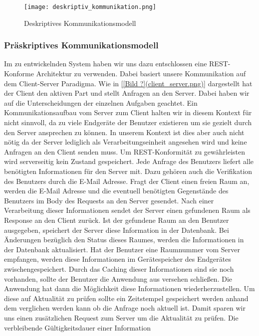 \begin{figure}[h]
	\centering
	\texttt{[image: deskriptiv\_kommunikation.png]}
	\caption{ Deskriptives Kommunikationsmodell}
\end{figure}

\subsubsection{Präskriptives Kommunikationsmodell}
\label{sec:Präskriptives_Kommunikationsmodell}

Im zu entwickelnden System haben wir uns dazu entschlossen eine REST-Konforme
Architektur zu verwenden.
Dabei basiert unsere Kommunikation auf dem Client-Server Paradigma. Wie in 
\ref{[Bild ?](client_server.png)} dargestellt hat der Client den aktiven 
Part und stellt Anfragen an den Server.
Dabei haben wir auf die Unterscheidungen der einzelnen Aufgaben geachtet.
Ein Kommunikationsaufbau vom Server zum Client halten wir in diesem Kontext für
nicht sinnvoll, da zu viele Endgeräte der Benutzer existieren um sie gezielt
durch den Server ansprechen zu können. In unserem Kontext ist dies aber auch
nicht nötig da der Server lediglich als Verarbeitungseinheit angesehen wird und
keine Anfragen an den Client senden muss.
Um REST-Konformität zu gewährleisten wird serverseitig kein Zustand gespeichert.
Jede Anfrage des Benutzers liefert alle benötigten Informationen für den Server
mit. Dazu gehören auch die Verifikation des Benutzers durch die E-Mail Adresse.
Fragt der Client einen freien Raum an, werden die E-Mail Adresse und die
eventuell benötigten Gegenstände des Benutzers im Body des Requests an den
Server gesendet. Nach einer Verarbeitung dieser Informationen sendet der Server
einen gefundenen Raum als Response an den Client zurück. Ist der gefundene Raum
an den Benutzer ausgegeben, speichert der Server diese Information in der
Datenbank. Bei Änderungen bezüglich den Status dieses Raumes, werden die
Informationen in der Datenbank aktualisiert.
Hat der Benutzer eine Raumnummer vom Server empfangen, werden diese
Informationen im Gerätespeicher des Endgerätes zwischengespeichert. Durch das
Caching dieser Informationen sind sie noch vorhanden, sollte der Benutzer die
Anwendung aus versehen schließen. Die Anwendung hat dann die Möglichkeit diese
Informationen wiederherzustellen. Um diese auf Aktualität zu prüfen sollte ein
Zeitstempel gespeichert werden anhand dem verglichen werden kann ob die Anfrage
noch aktuell ist. Damit sparen wir uns einen zusätzlichen Request zum Server um
die Aktualität zu prüfen. Die verbleibende Gültigkeitsdauer einer Information
